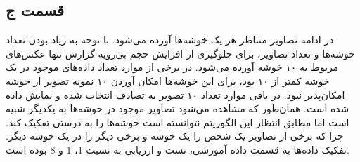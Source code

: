 \documentclass[12pt, a4paper]{article}
\begin{document}
\subsection*{قسمت ج}

در ادامه تصاویر متناظر هر یک خوشه‌‌ها آورده می‌شود. با توجه به زیاد بودن تعداد خوشه‌ها و تعداد تصاویر،
برای جلوگیری از افزایش حجم بی‌رویه گزارش تنها عکس‌های مربوط به ۱۰ خوشه آورده می‌شود.
در برخی از موارد تعداد داده‌های موجود در یک خوشه
کمتر از ۱۰ بود، برای این خوشه‌ها امکان آوردن ۱۰ نمونه تصویر از خوشه امکان‌پذیر نبود.
در باقی موارد تعداد ۱۰ تصویر به تصادف انتخاب شده و نمایش داده شده است.
همان‌طور که مشاهده می‌شود تصاویر موجود در خوشه‌ها به یکدیگر شبیه است اما مطابق انتظار
این الگوریتم نتوانسته است خوشه‌ها را به درستی تفکیک کند. چرا که برخی از تصاویر یک شخص را
یک خوشه و برخی دیگر را در یک خوشه دیگر. تفکیک داده‌ها به قسمت داده آموزشی، تست و ارزیابی
به نسبت 1، 1 و 8 بوده است.
\end{document}
